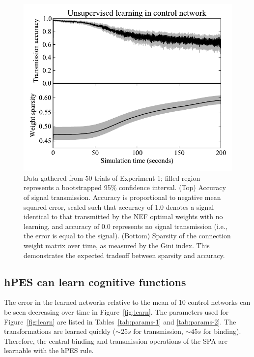 \documentclass[10pt,letterpaper]{article}
\begin{document}
\begin{figure}[ht]
\begin{center}
\includegraphics[width=\columnwidth]{fig3-bcm}
\end{center}
\caption{Data gathered from 50 trials of Experiment 1;
  filled region represents a bootstrapped 95\% confidence interval.
  (Top) Accuracy of signal transmission.
  Accuracy is proportional to negative mean squared error,
  scaled such that accuracy of 1.0
  denotes a signal identical to that transmitted by the
  NEF optimal weights with no learning, and
  accuracy of 0.0 represents no signal transmission
  (i.e., the error is equal to the signal).
  (Bottom) Sparsity of the connection weight matrix over time,
  as measured by the Gini index. This demonstrates
  the expected tradeoff between sparsity and accuracy.}
\label{fig:bcm}
\end{figure}

\subsection{hPES can learn cognitive functions}

The error in the learned networks
relative to the mean of 10 control networks
can be seen decreasing over time in Figure~\ref{fig:learn}.
The parameters used for Figure~\ref{fig:learn}
are listed in Tables~\ref{tab:params-1} and \ref{tab:params-2}.
The transformations are learned quickly
($\sim 25s$ for transmission, $\sim 45s$ for binding).
Therefore, the central binding and transmission
operations of the SPA
are learnable with the hPES rule.
\end{document}
